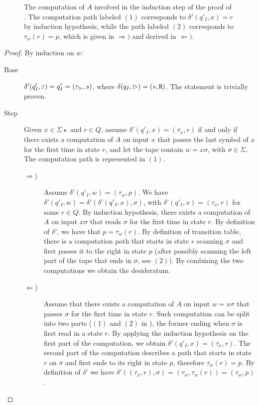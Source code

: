 \begin{figure}
	\centering
	
	\caption{The computation of $A$ involved in the induction step of the proof of .
		The computation path labeled $(1)$ corresponds to $\delta'(q'_I,x)=r$ by induction hypothesis, while the path labeled $(2)$ corresponds to $\tau_w(r)=p$, which is given in $\Rightarrow)$ and derived in $\Leftarrow)$.}
	\label{fig:transtabproof}
\end{figure}

\begin{proof}
	By induction on $w$:
	\begin{description}
		\item[Base] $\delta'(q'_I,\varepsilon)=q'_I=(\tau_\rhd,s)$, where $\delta(q_I,\rhd)=(s,\mathtt R)$. The statement is trivially proven.
		\item[Step] Given $x\in\Sigma\star$ and $r\in Q$, assume $\delta'(q'_I,x)=(\tau_x,r)$ if and only if there exists a computation of $A$ on input $x$ that passes the last symbol of $x$ for the first time in state $r$, and let the tape contain $w=x\sigma$, with $\sigma\in\Sigma$. The computation path is represented in  $(1)$.
		      \begin{description}
			      \item[$\Rightarrow$)] Assume $\delta'(q'_I,w)=(\tau_w,p)$.
			            We have $\delta'(q'_I,w)=\delta'(\delta'(q'_I,x),\sigma)$, with $\delta'(q'_I,x)=(\tau_x,r)$ for some $r\in Q$.
			            By induction hypothesis, there exists a computation of $A$ on input $x\sigma$ that reads $\sigma$ for the first time in state $r$.
			            By definition of $\delta'$, we have that $p=\tau_w(r)$.
			            By definition of transition table, there is a computation path that starts in state $r$ scanning $\sigma$ and first passes it to the right in state $p$ (after possibly scanning the left part of the tape that ends in $\sigma$, see  $(2)$).
			            By combining the two computations we obtain the desideratum.
			      \item[$\Leftarrow$)] Assume that there exists a computation of $A$ on input $w=x\sigma$ that passes $\sigma$ for the first time in state $r$.
			            Such computation can be split into two parts ($(1)$ and $(2)$ in ), the former ending when $\sigma$ is first read in a state $r$.
			            By applying the induction hypothesis on the first part of the computation, we obtain $\delta'(q'_I,x)=(\tau_x,r)$.
			            The second part of the computation describes a path that starts in state $r$ on $\sigma$ and first ends to its right in state $p$, therefore $\tau_w(r)=p$.
			            By definition of $\delta'$ we have $\delta'((\tau_x,r),\sigma)=(\tau_w,\tau_w(r))=(\tau_w,p)$. \qedhere
		      \end{description}
	\end{description}
\end{proof}

